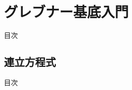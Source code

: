\documentclass[aspectratio=169, dvipdfmx, 11pt]{beamer} %
\begin{document}
\section{グレブナー基底入門}
\begin{frame}{目次}
	\tableofcontents[currentsection]
\end{frame}

\subsection{連立方程式}
\begin{frame}{目次}
	\tableofcontents[currentsubsection]
\end{frame}



%
%
\end{document}
